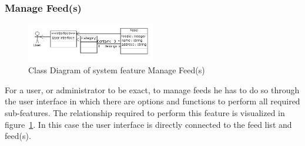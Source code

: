 \newpage
\subsubsection{Manage Feed(s)}
\begin{figure}[hbt]
\centering
\includegraphics[width=0.5\textwidth]
{./images/ManageFeeds.png}
\caption{Class Diagram of system feature Manage Feed(s)}
\label{fig:manage}
\end{figure}
For a user, or administrator to be exact, to manage feeds he has to do so through the user interface in which there are options and functions to perform all required sub-features. The relationship required to perform this feature is visualized in figure~\ref{fig:manage}. In this case the user interface is directly connected to the feed list and feed(s). \\
